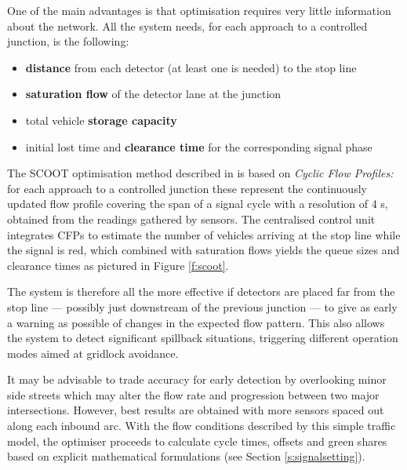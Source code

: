 One of the main advantages is that optimisation requires very little information about the network. All the system needs, for each approach to a controlled junction, is the following:
\begin{itemize}
\item \textbf{distance} from each detector (at least one is needed) to the stop line
\item \textbf{saturation flow} of the detector lane at the junction
\item total vehicle \textbf{storage capacity}
\item initial lost time and \textbf{clearance time} for the corresponding signal phase
\end{itemize}

The SCOOT optimisation method described in \citep{robertson1986research} is based on \emph{Cyclic Flow Profiles:} for each approach to a controlled junction these represent the continuously updated flow profile covering the span of a signal cycle with a resolution of 4 s, obtained from the readings gathered by sensors.
The centralised control unit integrates CFPs to estimate the number of vehicles arriving at the stop line while the signal is red, which combined with saturation flows yields the queue sizes and clearance times as pictured in Figure \ref{f:scoot}.

The system is therefore all the more effective if detectors are placed far from the stop line — possibly just downstream of the previous junction — to give as early a warning as possible of changes in the expected flow pattern. This also allows the system to detect significant spillback situations, triggering different operation modes aimed at gridlock avoidance.

It may be advisable to trade accuracy for early detection by overlooking minor side streets which may alter the flow rate and progression between two major intersections. However, best results are obtained with more sensors spaced out along each inbound arc.
With the flow conditions described by this simple traffic model, the optimiser proceeds to calculate cycle times, offsets and green shares based on explicit mathematical formulations (see Section \ref{s:signalsetting}). 

